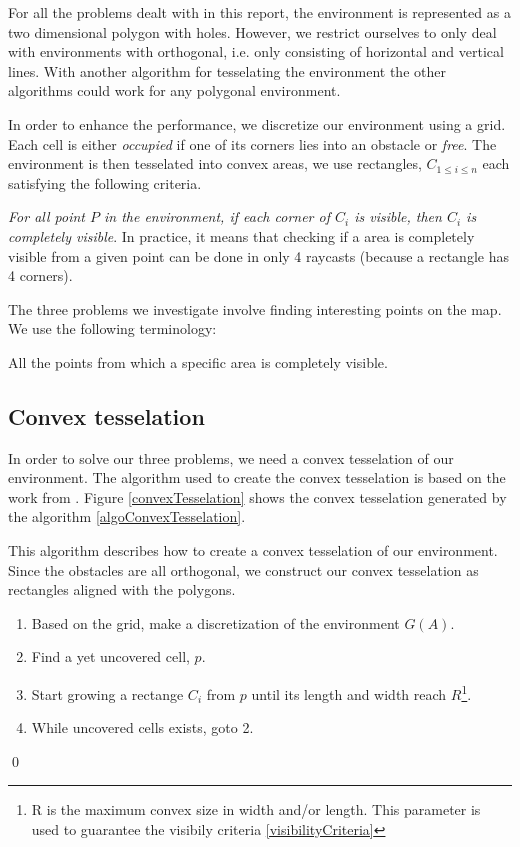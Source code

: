 For all the problems dealt with in this report, the environment is represented as a two dimensional polygon with holes. However, we restrict ourselves to only deal with environments with orthogonal, i.e. only consisting of horizontal and vertical lines. With another algorithm for tesselating the environment the other algorithms could work for any polygonal environment.

In order to enhance the performance, we discretize our environment using a grid. Each cell is either \emph{occupied} if one of its corners lies into an obstacle or \emph{free}.
The environment is then tesselated into convex areas, we use rectangles, $C_{1\leq i \leq n}$ each satisfying the following criteria.

\begin{criteria}[of Visibility]
 \emph{For all point $P$ in the environment, if each corner of $C_i$ is visible, then $C_i$ is completely visible}. In practice, it means that checking if a area is completely visible from a given point can be done in only 4 raycasts (because a rectangle has 4 corners).
\label{visibilityCriteria}
\end{criteria}


The three problems we investigate involve finding interesting points on the map. We use the following terminology:
\begin{definition}
All the points from which a specific area is completely visible.
\end{definition}

\subsection{Convex tesselation}

In order to solve our three problems, we need a convex tesselation of our environment. The algorithm used to create the convex tesselation is based on the work from \cite{CoopMinTime}. Figure \ref{convexTesselation} shows the convex tesselation generated by the algorithm \ref{algoConvexTesselation}.

\begin{algorithm}
This algorithm describes how to create a convex tesselation of our environment. Since the obstacles are all orthogonal, we construct our convex tesselation as rectangles aligned with the polygons.
\begin{enumerate}[topsep=1pt,itemsep=0ex,partopsep=1ex,parsep=1ex]
\item Based on the grid, make a discretization of the environment $G(A)$.
\item Find a yet uncovered cell, $p$.
\item Start growing a rectange $C_i$ from $p$ until its length and width reach $R$\footnote{R is the maximum convex size in width and/or length. This parameter is used to guarantee the visibily criteria \ref{visibilityCriteria}}.
\item While uncovered cells exists, goto 2.
\end{enumerate}
\qed
\label{algoConvexTesselation}
\end{algorithm}

